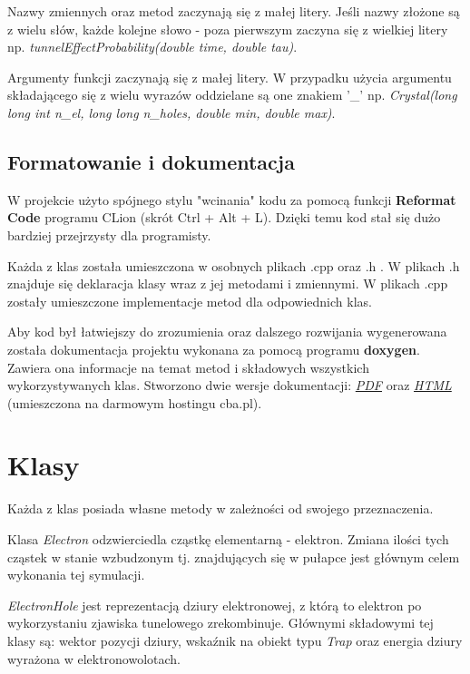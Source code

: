 Nazwy zmiennych oraz metod zaczynają się z małej litery. Jeśli nazwy złożone są z wielu słów, każde kolejne słowo - poza pierwszym zaczyna się z wielkiej litery np. \textit{tunnelEffectProbability(double time, double tau)}. 

Argumenty funkcji zaczynają się z małej litery. W przypadku użycia argumentu składającego się z wielu wyrazów oddzielane są one znakiem '\_'  np. \textit{Crystal(long long int n\_el, long long n\_holes, double min, double max)}.

\subsection{Formatowanie i dokumentacja}

W projekcie użyto spójnego stylu "wcinania" kodu za pomocą funkcji \textbf{Reformat Code} programu CLion (skrót Ctrl + Alt + L). Dzięki temu kod stał się dużo bardziej przejrzysty dla programisty.

Każda z klas została umieszczona w osobnych plikach .cpp oraz .h . W plikach .h znajduje się deklaracja klasy wraz z jej metodami i zmiennymi. W plikach .cpp zostały umieszczone implementacje metod dla odpowiednich klas. 

Aby kod był łatwiejszy do zrozumienia oraz dalszego rozwijania wygenerowana została dokumentacja projektu wykonana za pomocą programu \textbf{doxygen}. Zawiera ona informacje na temat metod i składowych wszystkich wykorzystywanych klas. Stworzono dwie wersje dokumentacji: \href{https://github.com/Sharkuu/Dissertation/blob/master/Dokumentacja\%20pdf/Dokumentacja.pdf}{\emph{PDF}} oraz \href{http://dokumentacja.c0.pl/}{\emph{HTML}} (umieszczona na darmowym hostingu cba.pl).

\section{Klasy}
Każda z klas posiada własne metody w zależności od swojego przeznaczenia.

Klasa \textit{Electron} odzwierciedla cząstkę elementarną - elektron. Zmiana ilości tych cząstek w stanie wzbudzonym tj. znajdujących się w pułapce jest głównym celem wykonania tej symulacji.

\textit{ElectronHole} jest reprezentacją dziury elektronowej, z którą to elektron po wykorzystaniu zjawiska tunelowego zrekombinuje. Głównymi składowymi tej klasy są: wektor pozycji dziury, wskaźnik na obiekt typu \textit{Trap} oraz energia dziury wyrażona w elektronowolotach. 

